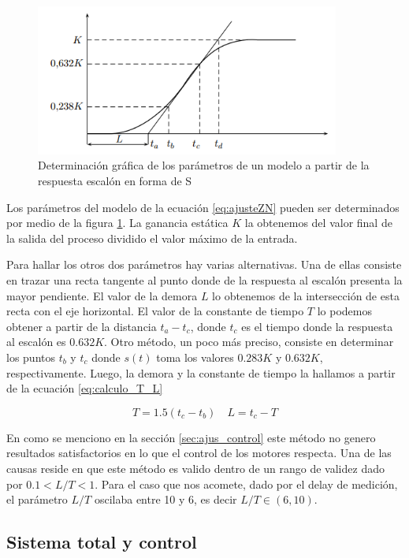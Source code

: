 \documentclass[10pt,conference,a4paper,onecolumn]{article}%
\begin{document}
\begin{figure}[h]
\centering
\includegraphics[width=10cm]{./imagenes/escalon_z-n.png}
\caption{Determinación gráfica de los parámetros de un modelo a partir de
la respuesta escalón en forma de S}
\label{fig:escalon_zn}
\end{figure}




Los parámetros del modelo de la ecuación \ref{eq:ajusteZN} pueden ser determinados por medio de la figura \ref{fig:escalon_zn}. La ganancia estática $K$ la obtenemos del valor final de la salida del proceso dividido el valor máximo de la entrada. 

Para hallar los otros dos parámetros hay varias alternativas. Una de ellas consiste en trazar una recta tangente al punto donde de la respuesta al escalón presenta la mayor pendiente. El valor de la demora $L$ lo obtenemos de la intersección de esta recta con el eje horizontal. El valor de la constante de tiempo $T$ lo podemos obtener a partir de la distancia $t_a-t_c $, donde $t_c$ es el tiempo donde la respuesta al escalón es $0.632K$.
Otro método, un poco más preciso, consiste en determinar los puntos $t_b$ y $t_c$ donde $s(t)$ toma los valores $0.283K$ y $0.632K$, respectivamente. Luego, la demora y la constante de tiempo la hallamos a partir de la ecuación \ref{eq:calculo_T_L}

\begin{equation}
T=1.5(t_c -t_b) \quad	L=t_c-T
\label{eq:calculo_T_L}
\end{equation}

En como se menciono en la sección \ref{sec:ajus_control} este método no genero resultados satisfactorios en lo que el control de los motores respecta. Una de las causas reside en que este método es valido dentro de un rango de validez \cite[pág. 60]{biblia_PID} dado por $0.1<L/T<1$. Para el caso que nos acomete, dado por el delay de medición, el parámetro $L/T$ oscilaba entre 10 y 6, es decir $L/T \in (6,10) $. 
\subsection{Sistema total y control}
\end{document}
